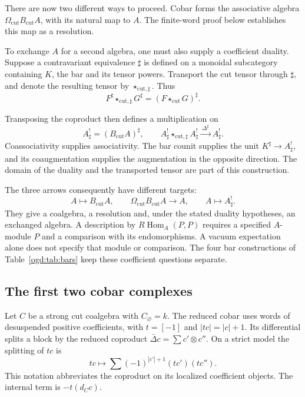 There are now two different ways to proceed. Cobar forms the associative
algebra $\Omega_{\mathrm{cut}}B_{\mathrm{cut}}A$, with its natural map
to $A$. The finite-word proof below establishes this map as a resolution.

To\label{ogd:def:dual-cut-tensor} exchange $A$ for a second algebra, one must also supply a coefficient
duality. Suppose a contravariant equivalence $\sharp$ is defined on
a monoidal subcategory containing $K$, the bar and its tensor powers.
Transport the cut tensor through $\sharp$, and denote the resulting
tensor by $\star_{\mathrm{cut},\sharp}$. Thus
\[
 F^\sharp\star_{\mathrm{cut},\sharp} G^\sharp
       =(F\star_{\mathrm{cut}}G)^\sharp.
\]

Transposing the coproduct then defines a multiplication on
\[
 A^!_\sharp=(B_{\mathrm{cut}}A)^\sharp,
 \qquad
 A^!_\sharp\star_{\mathrm{cut},\sharp} A^!_\sharp
       \xrightarrow{\ \Delta^\sharp\ } A^!_\sharp.
\]
Coassociativity supplies associativity. The bar counit supplies the unit
$K^\sharp\to A^!_\sharp$, and its coaugmentation supplies the augmentation
in the opposite direction. The domain of the duality and the transported
tensor are part of this construction.

The three arrows consequently have different targets:
\[
 A\longmapsto B_{\mathrm{cut}}A,\qquad
 \Omega_{\mathrm{cut}}B_{\mathrm{cut}}A\longrightarrow A,\qquad
 A\longmapsto A^!_\sharp.
\]
They give a coalgebra, a resolution and, under the stated duality
hypotheses, an exchanged algebra. A description by
$R\operatorname{Hom}_A(P,P)$ requires a specified $A$-module $P$
and a comparison with its endomorphisms. A vacuum expectation alone
does not specify that module or comparison. The four bar constructions
of Table~\ref{ogd:tab:bars} keep these coefficient questions separate.

\subsection{The first two cobar complexes}
\label{ogd:sec:first-cut-cobar}

Let\label{ogd:def:strong-cut-cobar-input} $C$ be a strong cut coalgebra with $C_\varnothing=k$.
The reduced cobar uses words of desuspended positive coefficients,
with $t=[-1]$ and $|tc|=|c|+1$. Its differential splits a block by
the reduced coproduct $\bar\Delta c=\sum c'\otimes c''$.
On a strict model the splitting of $tc$ is
\[
 tc\longmapsto
 \sum (-1)^{|c'|+1}(tc')(tc'').
\]
This notation abbreviates the coproduct on its localized coefficient
objects. The internal term is $-t(d_Cc)$.

